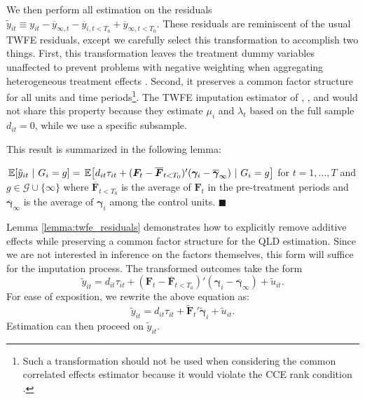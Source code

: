 \documentclass[12pt]{article}
\begin{document}
We then perform all estimation on the residuals $\tilde{y}_{it} \equiv y_{it} - \overline{y}_{\infty, t} - \overline{y}_{i,t < T_0} + \overline{y}_{\infty, t < T_0}$. These residuals are reminiscent of the usual TWFE residuals, except we carefully select this transformation to accomplish two things. First, this transformation leaves the treatment dummy variables unaffected to prevent problems with negative weighting when aggregating heterogeneous treatment effects \citep{Goodman-Bacon_2021,Borusyak_Jaravel_Spiess_2021}. Second, it preserves a common factor structure for all units and time periods\footnote{Such a transformation should not be used when considering the common correlated effects estimator because it would violate the CCE rank condition \citep{Brown_Butts_Westerlund_2023}.}. The TWFE imputation estimator of \citet{Gardner_2021}, \citet{Wooldridge_2021}, and \citet{Borusyak_Jaravel_Spiess_2021} would not share this property because they estimate $\mu_i$ and $\lambda_t$ based on the full sample $d_{it} = 0$, while we use a specific subsample.

This result is summarized in the following lemma:
\begin{lemma}\label{lemma:twfe_residuals}
  $\expec{\tilde{y}_{it}}{G_i = g} = \expec{d_{it}\tau_{it} + (\bm{F}_t - \overline{\bm{F}}_{t < T_0})' (\bm \gamma_i - \overline{\bm \gamma}_{\infty}) }{G_i = g}$ for $t = 1,...,T$ and $g \in \mathcal{G} \cup \{ \infty \}$ where $\overline{\bm{F}}_{t < T_0}$ is the average of $\bm{F}_t$ in the pre-treatment periods and $\overline{\bm\gamma}_\infty$ is the average of $\bm \gamma_i$ among the control units. $\blacksquare$
\end{lemma}

Lemma \ref{lemma:twfe_residuals} demonstrates how to explicitly remove additive effects while preserving a common factor structure for the QLD estimation. Since we are not interested in inference on the factors themselves, this form will suffice for the imputation process. The transformed outcomes take the form
\begin{equation}
  \tilde{y}_{it} = d_{it} \tau_{it} + (\bm{F}_t - \overline{\bm{F}}_{t < T_0})' (\bm \gamma_i - \overline{\bm \gamma}_\infty) + \tilde{u}_{it}.
\end{equation}
For ease of exposition, we rewrite the above equation as:
\begin{equation}
  \tilde{y}_{it} = d_{it} \tau_{it} + \tilde{\bm{F}}_t' \tilde{\bm \gamma}_i + \tilde{u}_{it}.
\end{equation}
Estimation can then proceed on $\tilde{y}_{it}$.
\end{document}
